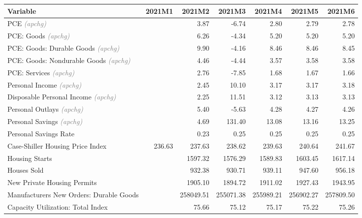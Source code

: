 \documentclass[11pt, letterpaper]{article}\usepackage[]{graphicx}\usepackage[]{color}
\begin{document}
\begin{table}[H]
\centering
\begingroup\fontsize{10pt}{12pt}\selectfont
\begin{tabular}{lrrrrrr}
  \hline
Variable & 2021M1 & 2021M2 & 2021M3 & 2021M4 & 2021M5 & 2021M6 \\ 
  \hline
PCE \textit{\footnotesize\textcolor{gray}{(apchg)}} &  & 3.87 & -6.74 & 2.80 & 2.79 & 2.78 \\ 
  PCE: Goods \textit{\footnotesize\textcolor{gray}{(apchg)}} &  & 6.26 & -4.34 & 5.20 & 5.20 & 5.20 \\ 
  PCE: Goods: Durable Goods \textit{\footnotesize\textcolor{gray}{(apchg)}} &  & 9.90 & -4.16 & 8.46 & 8.46 & 8.45 \\ 
  PCE: Goods: Nondurable Goods \textit{\footnotesize\textcolor{gray}{(apchg)}} &  & 4.46 & -4.44 & 3.57 & 3.58 & 3.58 \\ 
  PCE: Services \textit{\footnotesize\textcolor{gray}{(apchg)}} &  & 2.76 & -7.85 & 1.68 & 1.67 & 1.66 \\ 
  Personal Income \textit{\footnotesize\textcolor{gray}{(apchg)}} &  & 2.45 & 10.10 & 3.17 & 3.17 & 3.18 \\ 
  Disposable Personal Income \textit{\footnotesize\textcolor{gray}{(apchg)}} &  & 2.25 & 11.51 & 3.12 & 3.13 & 3.13 \\ 
  Personal Outlays \textit{\footnotesize\textcolor{gray}{(apchg)}} &  & 5.40 & -5.63 & 4.28 & 4.27 & 4.26 \\ 
  Personal Savings \textit{\footnotesize\textcolor{gray}{(apchg)}} &  & 4.69 & 131.40 & 13.08 & 13.16 & 13.25 \\ 
  Personal Savings Rate &  & 0.23 & 0.25 & 0.25 & 0.25 & 0.25 \\ 
  Case-Shiller Housing Price Index & 236.63 & 237.63 & 238.62 & 239.63 & 240.64 & 241.67 \\ 
  Housing Starts &  & 1597.32 & 1576.29 & 1589.83 & 1603.45 & 1617.14 \\ 
  Houses Sold &  & 932.38 & 930.71 & 939.11 & 947.60 & 956.18 \\ 
  New Private Housing Permits &  & 1905.10 & 1894.72 & 1911.02 & 1927.43 & 1943.95 \\ 
  Manufacturers New Orders: Durable Goods &  & 258049.51 & 255071.38 & 255989.21 & 256902.27 & 257809.50 \\ 
  Capacity Utilization: Total Index &  & 75.66 & 75.12 & 75.17 & 75.22 & 75.26 \\ 

\end{tabular}
\end{table}
\end{document}
